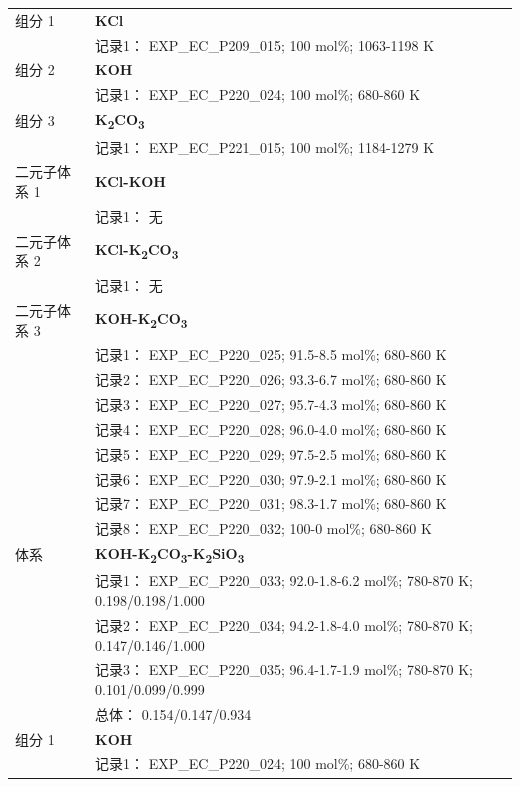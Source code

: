 \documentclass[12pt]{article}
\begin{document}
{\begin{longtable}[]{@{}
  >{\raggedright\arraybackslash}p{}
  >{\raggedright\arraybackslash}p{}@{}}
组分 1  & \textbf{KCl} \\
 & 记录1： EXP\_EC\_P209\_015; 100 mol\%; 1063-1198 K  \\

组分 2  & \textbf{KOH} \\
 & 记录1： EXP\_EC\_P220\_024; 100 mol\%; 680-860 K  \\

组分 3  & \textbf{K\textsubscript{2}CO\textsubscript{3}} \\
 & 记录1： EXP\_EC\_P221\_015; 100 mol\%; 1184-1279 K  \\

二元子体系 1 & \textbf{KCl-KOH} \\
 & 记录1： 无 \\
二元子体系 2 & \textbf{KCl-K\textsubscript{2}CO\textsubscript{3}} \\
 & 记录1： 无 \\
二元子体系 3  & \textbf{KOH-K\textsubscript{2}CO\textsubscript{3}} \\
 & 记录1： EXP\_EC\_P220\_025; 91.5-8.5 mol\%; 680-860 K \\
 & 记录2： EXP\_EC\_P220\_026; 93.3-6.7 mol\%; 680-860 K \\
 & 记录3： EXP\_EC\_P220\_027; 95.7-4.3 mol\%; 680-860 K \\
 & 记录4： EXP\_EC\_P220\_028; 96.0-4.0 mol\%; 680-860 K \\
 & 记录5： EXP\_EC\_P220\_029; 97.5-2.5 mol\%; 680-860 K \\
 & 记录6： EXP\_EC\_P220\_030; 97.9-2.1 mol\%; 680-860 K \\
 & 记录7： EXP\_EC\_P220\_031; 98.3-1.7 mol\%; 680-860 K \\
 & 记录8： EXP\_EC\_P220\_032; 100-0 mol\%; 680-860 K  \\

\midrule
体系 & \textbf{KOH-K\textsubscript{2}CO\textsubscript{3}-K\textsubscript{2}SiO\textsubscript{3}} \\
 & 记录1： EXP\_EC\_P220\_033; 92.0-1.8-6.2 mol\%; 780-870 K; 0.198/0.198/1.000 \\
 & 记录2： EXP\_EC\_P220\_034; 94.2-1.8-4.0 mol\%; 780-870 K; 0.147/0.146/1.000 \\
 & 记录3： EXP\_EC\_P220\_035; 96.4-1.7-1.9 mol\%; 780-870 K; 0.101/0.099/0.999 \\
 & 总体： 0.154/0.147/0.934  \\

组分 1  & \textbf{KOH} \\
 & 记录1： EXP\_EC\_P220\_024; 100 mol\%; 680-860 K  \\


\end{longtable}}
\end{document}
